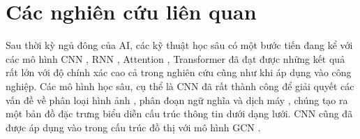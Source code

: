 \section{Các nghiên cứu liên quan}

Sau thời kỳ ngủ đông của AI, các kỹ thuật học sâu có một bước tiến đang kể với các mô hình CNN \cite{lecun1999object}, RNN \cite{hopfield2007hopfield}, Attention \cite{vaswani2017attention}, Transformer \cite{yang2019xlnet} đã đạt được những kết quả rất lớn với độ chính xác cao cả trong nghiên cứu cũng như khi áp dụng vào công nghiệp. Các mô hình học sâu, cụ thể là CNN đã rất thành công để giải quyết các vấn đề về phân loại hình ảnh \cite{he2016deep} , phân đoạn ngữ nghĩa \cite{jegou2017one} và dịch máy , chúng tạo ra một bản đồ đặc trưng biểu diễn cấu trúc thông tin dưới dạng lưới. CNN cũng đã được áp dụng vào trong cấu trúc đồ thị với mô hình GCN \cite{kipf2016semi}. 